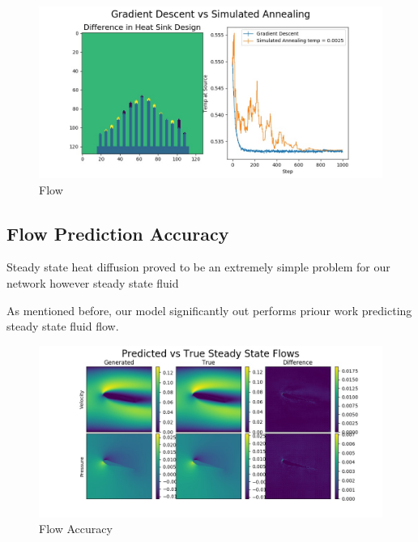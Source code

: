 \documentclass{article} %
\begin{document}
\begin{figure}[h]
\begin{center}
\includegraphics[scale=0.35]{../test/figs/heat_learn_comparison.jpeg}
\end{center}
\caption{Flow}
\end{figure}





\subsection{Flow Prediction Accuracy}

Steady state heat diffusion proved to be an extremely simple problem for our network however steady state fluid 

As mentioned before, our model significantly out performs priour work predicting steady state fluid flow. 

\begin{figure}[!t]
\begin{center}
\includegraphics[scale=0.35]{../test/figs/generated_flow_difference.jpeg}
\end{center}
\caption{Flow Accuracy}
\label{flow_accuracy}
\end{figure}
\end{document}
